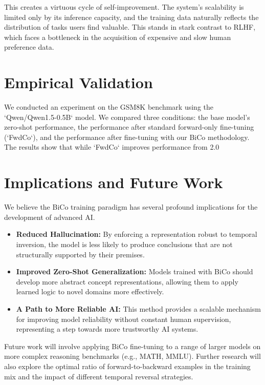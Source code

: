 \documentclass[11pt]{article}
\begin{document}
This creates a virtuous cycle of self-improvement. The system's scalability is limited only by its inference capacity, and the training data naturally reflects the distribution of tasks users find valuable. This stands in stark contrast to RLHF, which faces a bottleneck in the acquisition of expensive and slow human preference data.

\section{Empirical Validation}
We conducted an experiment on the GSM8K benchmark using the `Qwen/Qwen1.5-0.5B` model. We compared three conditions: the base model's zero-shot performance, the performance after standard forward-only fine-tuning (`FwdCo`), and the performance after fine-tuning with our BiCo methodology. The results show that while `FwdCo` improves performance from 2.0%

\section{Implications and Future Work}
We believe the BiCo training paradigm has several profound implications for the development of advanced AI.

\begin{itemize}
    \item \textbf{Reduced Hallucination:} By enforcing a representation robust to temporal inversion, the model is less likely to produce conclusions that are not structurally supported by their premises.
    \item \textbf{Improved Zero-Shot Generalization:} Models trained with BiCo should develop more abstract concept representations, allowing them to apply learned logic to novel domains more effectively.
    \item \textbf{A Path to More Reliable AI:} This method provides a scalable mechanism for improving model reliability without constant human supervision, representing a step towards more trustworthy AI systems.
\end{itemize}

Future work will involve applying BiCo fine-tuning to a range of larger models on more complex reasoning benchmarks (e.g., MATH, MMLU). Further research will also explore the optimal ratio of forward-to-backward examples in the training mix and the impact of different temporal reversal strategies.
\end{document}
